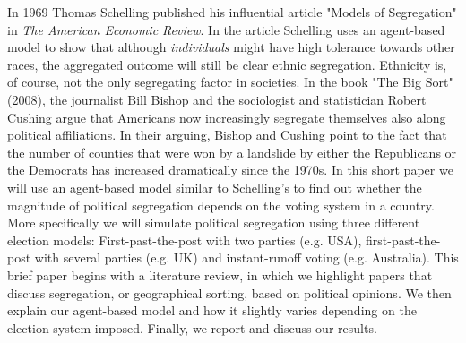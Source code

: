 \documentclass[12pt, a4paper]{article}
\begin{document}
	In 1969 Thomas Schelling published his influential article "Models of Segregation" in \textit{The American Economic Review}. In the article Schelling uses an agent-based model to show that although \textit{individuals} might have high tolerance towards other races, the aggregated outcome will still be clear ethnic segregation. Ethnicity is, of course, not the only segregating factor in societies. In the book "The Big Sort" (2008), the journalist Bill Bishop and the sociologist and statistician Robert Cushing argue that Americans now increasingly segregate themselves also along political affiliations. In their arguing, Bishop and Cushing point to the fact that the number of counties that were won by a landslide by either the Republicans or the Democrats has increased dramatically since the 1970s. 
	\newline In this short paper we will use an agent-based model similar to Schelling's to find out whether the magnitude of political segregation depends on the voting system in a country. More specifically we will simulate political segregation using three different election models: First-past-the-post with two parties (e.g. USA), first-past-the-post with several parties (e.g. UK) and instant-runoff voting (e.g. Australia). This brief paper begins with a literature review, in which we highlight papers that discuss segregation, or geographical sorting, based on political opinions. We then explain our agent-based model and how it slightly varies depending on the election system imposed. Finally, we report and discuss our results.
	
	
\end{document}
